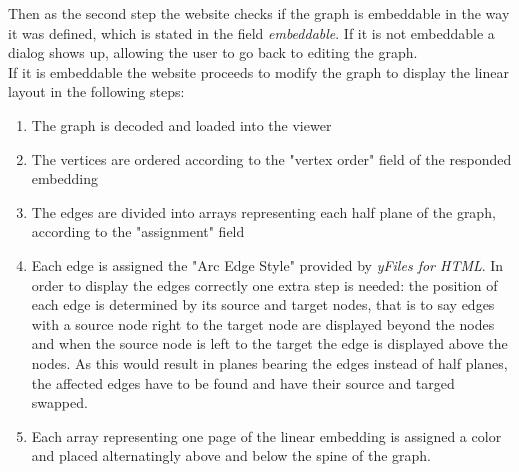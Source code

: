 Then as the second step the website checks if the graph is embeddable in the way it was defined, which is stated in the field \textit{embeddable}. If it is not embeddable a dialog shows up, allowing the user to go back to editing the graph.\\
If it is embeddable the website proceeds to modify the graph to display the linear layout in the following steps:
\begin{enumerate}
\item The graph is decoded and loaded into the viewer
\item The vertices are ordered according to the "vertex order" field of the responded embedding
\item The edges are divided into arrays representing each half plane of the graph, according to the "assignment" field\\
\item Each edge is assigned the "Arc Edge Style" provided by \textit{yFiles for HTML}. In order to display the edges correctly one extra step is needed: the position of each edge is determined by its source and target nodes, that is to say edges with a source node right to the target node are displayed beyond the nodes and when the source node is left to the target the edge is displayed above the nodes. As this would result in planes bearing the edges instead of half planes, the affected edges have to be found and have their source and targed swapped.
\item Each array representing one page of the linear embedding is assigned a color and placed alternatingly above and below the spine of the graph. 
\end{enumerate}

